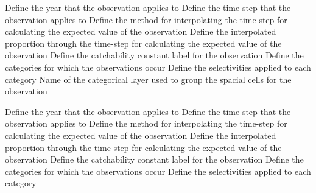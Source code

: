 \par\textbf{}\par
{} {Define the year that the observation applies to}
 {Define the time-step that the observation applies to}
 {Define the method for interpolating the time-step for calculating the expected value of the observation}
 {Define the interpolated proportion through the time-step for calculating the expected value of the observation}
 {Define the catchability constant label for the observation}
 {Define the categories for which the observations occur}
 {Define the selectivities applied to each category}
 {Name of the categorical layer used to group the spacial cells for the observation}
\par\textbf{}\par
{} {Define the year that the observation applies to}
 {Define the time-step that the observation applies to}
 {Define the method for interpolating the time-step for calculating the expected value of the observation}
 {Define the interpolated proportion through the time-step for calculating the expected value of the observation}
 {Define the catchability constant label for the observation}
 {Define the categories for which the observations occur}
 {Define the selectivities applied to each category}
